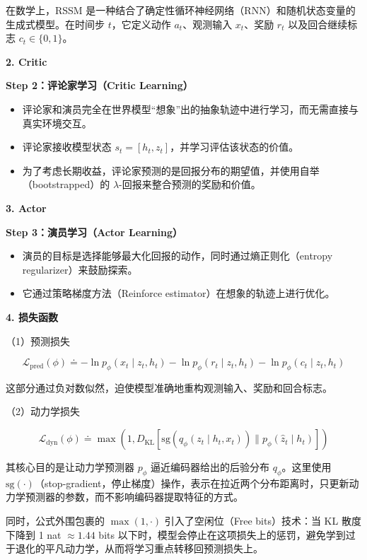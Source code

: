 在数学上，RSSM 是一种结合了确定性循环神经网络（RNN）和随机状态变量的生成式模型。在时间步 \(t\)，它定义动作 \(a_t\)、观测输入 \(x_t\)、奖励 \(r_t\) 以及回合继续标志 \(c_t \in \{0, 1\}\)。

\textbf{2. Critic}

\textbf{Step 2：评论家学习（Critic Learning）}

\begin{itemize}
\tightlist
\item
  评论家和演员完全在世界模型``想象''出的抽象轨迹中进行学习，而无需直接与真实环境交互。
\item
  评论家接收模型状态 \(s_t = [h_t, z_t]\)，并学习评估该状态的价值。
\item
  为了考虑长期收益，评论家预测的是回报分布的期望值，并使用自举（bootstrapped）的 \(\lambda\)-回报来整合预测的奖励和价值。
\end{itemize}

\textbf{3. Actor}

\textbf{Step 3：演员学习（Actor Learning）}

\begin{itemize}
\tightlist
\item
  演员的目标是选择能够最大化回报的动作，同时通过熵正则化（entropy regularizer）来鼓励探索。
\item
  它通过策略梯度方法（Reinforce estimator）在想象的轨迹上进行优化。
\end{itemize}

\textbf{4. 损失函数}

（1）预测损失

\[
\mathcal{L}_{\mathrm{pred}}(\phi)
\doteq
-\ln p_{\phi}(x_t \mid z_t, h_t)
-\ln p_{\phi}(r_t \mid z_t, h_t)
-\ln p_{\phi}(c_t \mid z_t, h_t)
\]

这部分通过负对数似然，迫使模型准确地重构观测输入、奖励和回合标志。

（2）动力学损失

\[
\mathcal{L}_{\mathrm{dyn}}(\phi)
\doteq
\max\left(
1,
D_{\mathrm{KL}}\left[
\mathrm{sg}(q_{\phi}(z_t \mid h_t, x_t))
\parallel
p_{\phi}(\hat{z}_t \mid h_t)
\right]
\right)
\]

其核心目的是让动力学预测器 \(p_{\phi}\) 逼近编码器给出的后验分布 \(q_{\phi}\)。这里使用 \(\mathrm{sg}(\cdot)\)（stop-gradient，停止梯度）操作，表示在拉近两个分布距离时，只更新动力学预测器的参数，而不影响编码器提取特征的方式。

同时，公式外围包裹的 \(\max(1, \cdot)\) 引入了空闲位（Free bits）技术：当 KL 散度下降到 1 nat \(\approx 1.44\) bits 以下时，模型会停止在这项损失上的惩罚，避免学到过于退化的平凡动力学，从而将学习重点转移回预测损失上。

